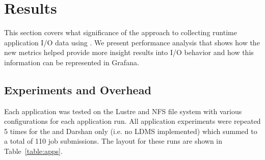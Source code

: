 \section{Results}
\label{sec:results}

This section covers what significance of the approach to collecting
runtime application I/O data using \Darshan. We present performance
analysis that shows how the new metrics helped provide more insight
results into I/O behavior and how this information can be represented
in Grafana.

\subsection{Experiments and Overhead}
Each application was tested on the Lustre and NFS file system with various configurations for each application run.  All application experiments were repeated 5 times for the \connector{} and Darshan only (i.e. no LDMS implemented) which summed to a total of 110 job submissions. The layout for these runs are shown in Table~\ref{table:apps}.  

